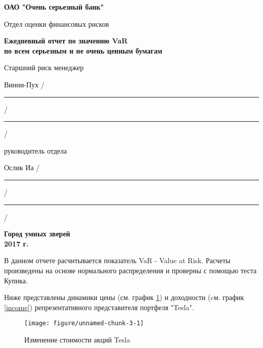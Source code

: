 \documentclass[12pt, a4paper]{article}\usepackage[]{graphicx}\usepackage[]{color}
\makeatletter
\def\maxwidth{ %
  \ifdim\Gin@nat@width>\linewidth
    \linewidth
  \else
    \Gin@nat@width
  \fi
}
\newenvironment{knitrout}{}{} %
\makeatother
\begin{document}
\thispagestyle{empty} %

\begingroup

\begin{center}
\small \bfseries ОАО "Очень серьезный банк"
\end{center}

\vfill


\noindent\small Отдел оценки финансовых рисков
\hfill

\begin{center}\bfseries
\large
Ежедневный отчет по значению VaR \\
по всем серьезным и не очень  ценным бумагам
\end{center}

\vfill

\noindent\normalsize
Старшний риск менеджер

\noindent
Винни-Пух
\hfill /\rule{6em}{0.5pt}/\rule{6em}{0.5pt}/

\hfill{}

\noindent
руководитель отдела

\noindent
Ослик Иа
\hfill /\rule{6em}{0.5pt}/\rule{6em}{0.5pt}/

\hfill{}



\vfill

\begin{center}
\normalsize \bfseries Город умных зверей \\ 2017 г.
\end{center}
\endgroup 

\newpage

В данном отчете расчитывается показатель VaR - Value at Risk. Расчеты произведены на основе нормального распределения и проверны с помощью теста Купика.



Ниже представлены динамики цены (см. график \ref{price}) и доходности (cм. график \ref{income}) репрезентативного представителя портфеля "Tesla".

\begin{figure}[h!]
\begin{knitrout}
\color{fgcolor}

{\centering \texttt{[image: figure/unnamed-chunk-3-1]} 

}



\end{knitrout}
\caption{Изменение стоимости акций Tesla \label{price}}
\end{figure}
\end{document}
